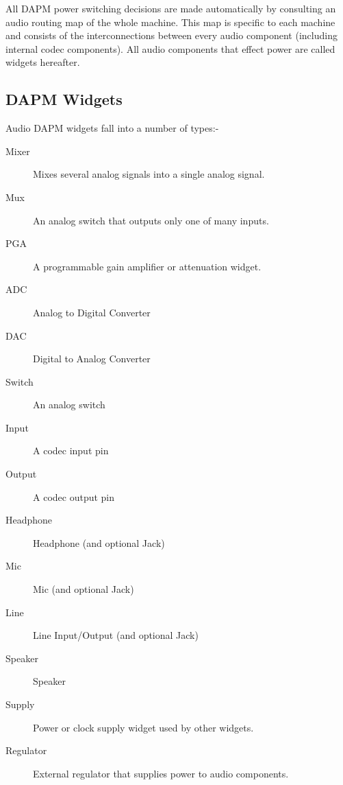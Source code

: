 \documentclass[a4paper,8pt,english]{sphinxmanual}
\begin{document}
All DAPM power switching decisions are made automatically by consulting an audio
routing map of the whole machine. This map is specific to each machine and
consists of the interconnections between every audio component (including
internal codec components). All audio components that effect power are called
widgets hereafter.


\subsection{DAPM Widgets}
\label{sound/soc/dapm:dapm-widgets}
Audio DAPM widgets fall into a number of types:-
\begin{description}
\item[{Mixer}] \leavevmode
Mixes several analog signals into a single analog signal.

\item[{Mux}] \leavevmode
An analog switch that outputs only one of many inputs.

\item[{PGA}] \leavevmode
A programmable gain amplifier or attenuation widget.

\item[{ADC}] \leavevmode
Analog to Digital Converter

\item[{DAC}] \leavevmode
Digital to Analog Converter

\item[{Switch}] \leavevmode
An analog switch

\item[{Input}] \leavevmode
A codec input pin

\item[{Output}] \leavevmode
A codec output pin

\item[{Headphone}] \leavevmode
Headphone (and optional Jack)

\item[{Mic}] \leavevmode
Mic (and optional Jack)

\item[{Line}] \leavevmode
Line Input/Output (and optional Jack)

\item[{Speaker}] \leavevmode
Speaker

\item[{Supply}] \leavevmode
Power or clock supply widget used by other widgets.

\item[{Regulator}] \leavevmode
External regulator that supplies power to audio components.


\end{description}
\end{document}
